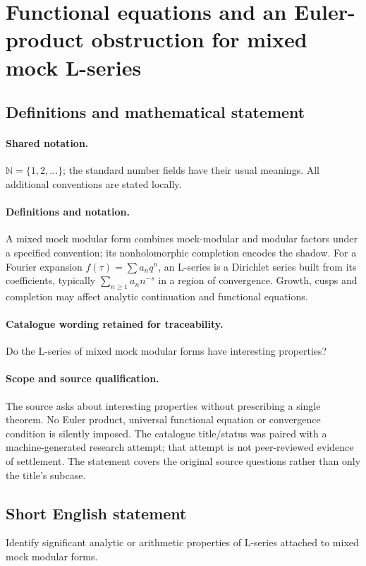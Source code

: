 \documentclass[11pt]{article}
\begin{document}
\section{Functional equations and an Euler-product obstruction for mixed mock L-series}\label{statement}

\subsection{Definitions and mathematical statement}

\paragraph{Shared notation.}$\mathbb N=\{1,2,\ldots\}$; the standard number fields have their usual meanings. All additional conventions are stated locally.


\paragraph{Definitions and notation.}A mixed mock modular form combines mock-modular and modular factors under a specified convention; its nonholomorphic completion encodes the shadow. For a Fourier expansion $f(\tau)=\sum a_nq^n$, an L-series is a Dirichlet series built from its coefficients, typically $\sum_{n\ge1}a_n n^{-s}$ in a region of convergence. Growth, cusps and completion may affect analytic continuation and functional equations.

\paragraph{Catalogue wording retained for traceability.}
Do the L-series of mixed mock modular forms have interesting properties?
\paragraph{Scope and source qualification.}The source asks about interesting properties without prescribing a single theorem. No Euler product, universal functional equation or convergence condition is silently imposed. The catalogue title/status was paired with a machine-generated research attempt; that attempt is not peer-reviewed evidence of settlement. The statement covers the original source questions rather than only the title’s subcase.
\subsection{Short English statement}
Identify significant analytic or arithmetic properties of L-series attached to mixed mock modular forms.
\end{document}
